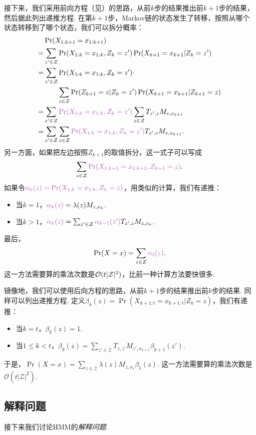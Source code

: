 接下来，我们采用前向方程（见）的思路，从前$k$步的结果推出前$k+1$步的结果，然后据此列出递推方程. 在第$k+1$步，Markov链的状态发生了转移，按照从哪个状态转移到了哪个状态，我们可以拆分概率：
\begin{align*}
&\Pr(X_{1:k+1}=x_{1:k+1}) \\
    = &\sum_{z'\in \mathcal Z}\Pr(X_{1:k}=x_{1:k}, Z_k=z')\Pr(X_{k+1}=x_{k+1}|Z_k=z')\\
    = &\sum_{z'\in \mathcal Z}\Pr(X_{1:k}=x_{1:k}, Z_k=z')\cdot\\
    &\qquad\sum_{z\in \mathcal Z}\Pr(Z_{k+1}=z|Z_k=z')\Pr(X_{k+1}=x_{k+1}|Z_{k+1}=z)\\
    = &\sum_{z'\in \mathcal Z}\light{\Pr(X_{1:k}=x_{1:k}, Z_k=z')}\sum_{z\in \mathcal Z}T_{z',z}M_{z,x_{k+1}}\\
    = &\sum_{z'\in \mathcal Z}\sum_{z\in \mathcal Z}\light{\Pr(X_{1:k}=x_{1:k}, Z_k=z')}T_{z',z}M_{z,x_{k+1}}.
\end{align*}
另一方面，如果把左边按照$Z_{k+1}$的取值拆分，这一式子可以写成
\begin{align*}
    \sum_{z\in\mathcal Z}\light{\Pr(X_{1:k+1}=x_{1:k+1}, Z_{k+1}=z)}.
\end{align*}
如果令$\light{\alpha_k(z)=\Pr(X_{1:k}=x_{1:k}, Z_k=z)}$，用类似的计算，我们有递推：
\begin{itemize}
    \item 当$k=1$，$\light{\alpha_k(z)} = \lambda(z)M_{z,x_k}$.
    \item 当$k>1$，$\light{\alpha_k(z)} = \sum_{z' \in \mathcal Z}\light{\alpha_{k-1}(z')}T_{z',z}M_{z,x_k}$.
\end{itemize}
最后，
\[\Pr(X=x) = \sum_{z\in \mathcal Z}\light{\alpha_t(z)}.\]
这一方法需要算的乘法次数是$\mathcal{O}(t|\mathcal Z|^2)$，比前一种计算方法要快很多.

镜像地，我们可以使用后向方程的思路，从前$k+1$步的结果推出前$k$步的结果. 同样可以列出递推方程. 定义$\beta_k(z)=\Pr(X_{k+1:t}=x_{k+1:t} | Z_k=z)$，我们有递推：
\begin{itemize}
    \item 当$k = t$，$\beta_k(z) = 1$.
    \item 当$1 \leq k < t$，$\beta_{k}(z) = \sum_{z' \in \mathcal Z}T_{z,z'}M_{z',x_{k+1}}\beta_{k+1}(z')$.
\end{itemize}
于是，$\Pr(X=x) = \sum_{z\in \mathcal Z}\lambda(z)M_{z,x_1}\beta_1(z)$. 这一方法需要算的乘法次数是$\mathcal O(t|\mathcal Z|^2)$.


\subsection{解释问题}
接下来我们讨论HMM的\textit{解释问题}. 

